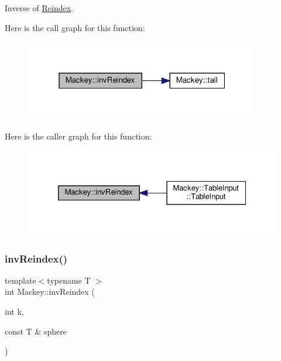 Inverse of \hyperlink{namespaceMackey_a7da73ade3ee83c4ffd614e79242d7c04}{Reindex}. 

Here is the call graph for this function\+:\nopagebreak
\begin{figure}[H]
\begin{center}
\leavevmode
\includegraphics[width=292pt]{namespaceMackey_a5efb3695c450e4e590b86f20700f726b_cgraph}
\end{center}
\end{figure}
Here is the caller graph for this function\+:\nopagebreak
\begin{figure}[H]
\begin{center}
\leavevmode
\includegraphics[width=325pt]{namespaceMackey_a5efb3695c450e4e590b86f20700f726b_icgraph}
\end{center}
\end{figure}
\mbox{\label{namespaceMackey_a011b8e23bc2eedf751a9ce7bdc9e4cb9}} 
\subsubsection{\texorpdfstring{inv\+Reindex()}{invReindex()}\hspace{0.1cm}{\footnotesize\ttfamily [2/2]}}
{\footnotesize\ttfamily template$<$typename T $>$ \\
int Mackey\+::inv\+Reindex (\begin{DoxyParamCaption}\item[{int}]{k,  }\item[{const T \&}]{sphere }\end{DoxyParamCaption})\hspace{0.3cm}{\ttfamily [inline]}}



